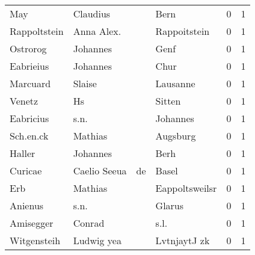 \begin{tabular}{llllrr}
                      May &                           Claudius &             &                                        Bern &          0 &         1 \\
             Rappoltstein &                         Anna Alex. &             &                                Rappoitstein &          0 &         1 \\
                 Ostrorog &                           Johannes &             &                                        Genf &          0 &         1 \\
                Eabrieius &                           Johannes &             &                                        Chur &          0 &         1 \\
                 Marcuard &                             Slaise &             &                                    Lausanne &          0 &         1 \\
                   Venetz &                                 Hs &             &                                      Sitten &          0 &         1 \\
                Eabricius &                               s.n. &             &                                    Johannes &          0 &         1 \\
                Sch.en.ck &                            Mathias &             &                                    Augsburg &          0 &         1 \\
                   Haller &                           Johannes &             &                                        Berh &          0 &         1 \\
                  Curicae &                       Caelio Seeua &          de &                                       Basel &          0 &         1 \\
                      Erb &                            Mathias &             &                              Eappoltsweilsr &          0 &         1 \\
                  Anienus &                               s.n. &             &                                      Glarus &          0 &         1 \\
                Amisegger &                             Conrad &             &                                        s.l. &          0 &         1 \\
              Witgensteih &                         Ludwig yea &             &                                LvtnjaytJ zk &          0 &         1 \\

\end{tabular}
